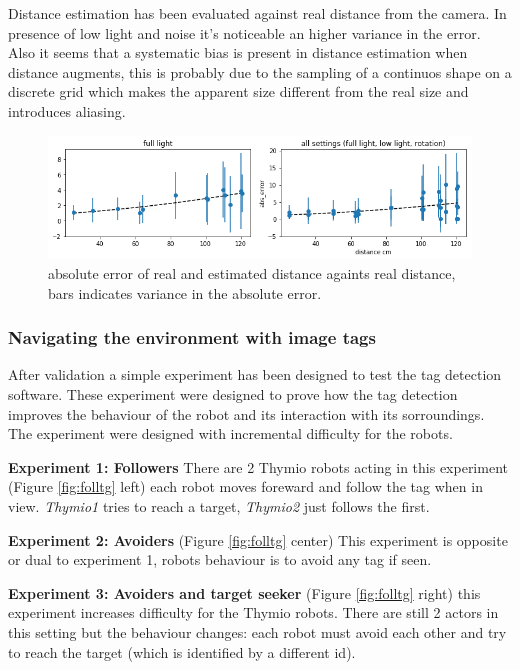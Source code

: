\documentclass[a4paper]{report}
\begin{document}
Distance estimation has been evaluated against real distance from the camera.
In presence of low light and noise it's noticeable an higher variance in the error. Also it seems that a systematic bias is present in distance estimation when distance augments, this is probably due to the sampling of a continuos shape on a discrete grid which makes the apparent size different from the real size and introduces aliasing.

\begin{figure}[H]
    \centering
    \includegraphics[width=1.0\textwidth]{distance.png}
    \caption{absolute error of real and estimated distance againts real distance, bars indicates variance in the absolute error.}
    \label{fig:dist}
\end{figure}

\subsubsection{Navigating the environment with image tags}

After validation a simple experiment has been designed to test the tag detection software. These experiment were designed to prove how the tag detection improves the behaviour of the robot and its interaction with its sorroundings. The experiment were designed with incremental difficulty for the robots.

\textbf{Experiment 1: Followers} There are 2 Thymio robots acting in this experiment (Figure \ref{fig:folltg} left) each robot moves foreward and follow the tag when in view. \textit{Thymio1} tries to reach a target, \textit{Thymio2} just follows the first.

\textbf{Experiment 2: Avoiders} (Figure \ref{fig:folltg} center) This experiment is opposite or dual to experiment 1, robots behaviour is to avoid any tag if seen.

\textbf{Experiment 3: Avoiders and target seeker} (Figure \ref{fig:folltg} right) this experiment increases difficulty for the Thymio robots. There are still 2 actors in this setting but the behaviour changes: each robot must avoid each other and try to reach the target (which is identified by a different id).
\end{document}
